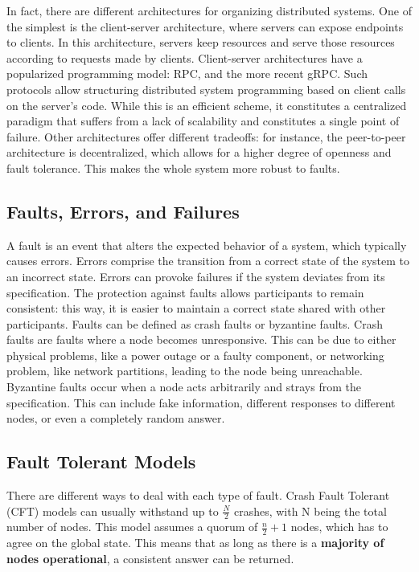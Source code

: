 \documentclass[12pt,a4paper]{article}
\begin{document}
In fact, there are different architectures for organizing distributed systems. One of the simplest is the client-server architecture, where servers can expose endpoints to clients.
In this architecture, servers keep resources and serve those resources according to requests made by clients. Client-server architectures have a popularized programming model: RPC, and the more recent gRPC. Such protocols allow structuring distributed system programming based on client calls on the server's code. While this is an efficient scheme, it constitutes a centralized paradigm that suffers from a lack of scalability and constitutes a single point of failure. Other architectures offer different tradeoffs: for instance, the peer-to-peer architecture is decentralized, which allows for a higher degree of openness and fault tolerance. This makes the whole system more robust to faults.

\subsection{Faults, Errors, and Failures}
A fault is an event that alters the expected behavior of a system, which typically causes errors. Errors comprise the transition from a correct state of the system to an incorrect state. Errors can provoke failures if the system deviates from its specification. The protection against faults allows participants to remain consistent: this way, it is easier to maintain a correct state shared with other participants. Faults can be defined as crash faults or byzantine faults. Crash faults are faults where a node becomes unresponsive. This can be due to either physical problems, like a power outage or a faulty component, or networking problem, like network partitions, leading to the node being unreachable. Byzantine faults occur when a node acts arbitrarily and strays from the specification. This can include fake information, different responses to different nodes, or even a completely random answer.

\subsection{Fault Tolerant Models}
There are different ways to deal with each type of fault.
Crash Fault Tolerant (CFT) models can usually withstand up to $\frac{N}{2}$ crashes, with N being the total number of nodes. This model assumes a quorum of $\frac{n}{2}+1$ nodes, which has to agree on the global state. This means that as long as there is a \textbf{majority of nodes operational}, a consistent answer can be returned.
\end{document}
